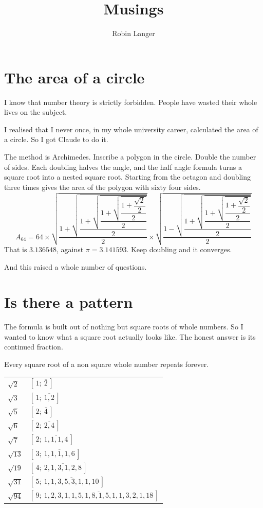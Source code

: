 \documentclass[11pt,a4paper]{article}
\title{Musings}
\author{Robin Langer}
\date{}
\theoremstyle{definition}
\theoremstyle{plain}
\begin{document}
\maketitle
\vspace{-2em}

\section{The area of a circle}

I know that number theory is strictly forbidden. People have wasted their whole
lives on the subject.

I realised that I never once, in my whole university career, calculated the area
of a circle. So I got Claude to do it.

The method is Archimedes. Inscribe a polygon in the circle. Double the number of
sides. Each doubling halves the angle, and the half angle formula turns a square
root into a nested square root. Starting from the octagon and doubling three
times gives the area of the polygon with sixty four sides.
\[
A_{64} = 64 \times \sqrt{\dfrac{1 + \sqrt{\dfrac{1 + \sqrt{\dfrac{1 + \sqrt{\dfrac{1 + \dfrac{\sqrt{2}}{2}}{2}}}{2}}}{2}}}{2}} \times \sqrt{\dfrac{1 - \sqrt{\dfrac{1 + \sqrt{\dfrac{1 + \sqrt{\dfrac{1 + \dfrac{\sqrt{2}}{2}}{2}}}{2}}}{2}}}{2}}
\]
That is $3.136548$, against $\pi = 3.141593$. Keep doubling and it converges.

And this raised a whole number of questions.

\section{Is there a pattern}

The formula is built out of nothing but square roots of whole numbers. So I
wanted to know what a square root actually looks like. The honest answer is its
continued fraction.

Every square root of a non square whole number repeats forever.

\begin{center}
\begin{tabular}{ll}
\toprule
$\sqrt{2}$  & $[\,1;\ \overline{2}\,]$ \\
$\sqrt{3}$  & $[\,1;\ \overline{1,2}\,]$ \\
$\sqrt{5}$  & $[\,2;\ \overline{4}\,]$ \\
$\sqrt{6}$  & $[\,2;\ \overline{2,4}\,]$ \\
$\sqrt{7}$  & $[\,2;\ \overline{1,1,1,4}\,]$ \\
$\sqrt{13}$ & $[\,3;\ \overline{1,1,1,1,6}\,]$ \\
$\sqrt{19}$ & $[\,4;\ \overline{2,1,3,1,2,8}\,]$ \\
$\sqrt{31}$ & $[\,5;\ \overline{1,1,3,5,3,1,1,10}\,]$ \\
$\sqrt{94}$ & $[\,9;\ \overline{1,2,3,1,1,5,1,8,1,5,1,1,3,2,1,18}\,]$ \\
\bottomrule
\end{tabular}
\end{center}
\end{document}
